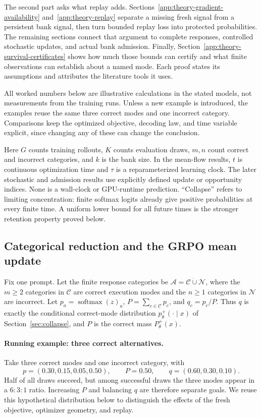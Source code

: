 \documentclass{article}
\newcommand{\1}{\mathbf 1}
\theoremstyle{remark}
\theoremstyle{definition}
\theoremstyle{plain}
\begin{document}
The second part asks what replay adds. Sections~\ref{app:theory-gradient-availability}
and~\ref{app:theory-replay} separate a missing fresh signal from a persistent
bank signal, then turn bounded replay loss into protected probabilities.
The remaining sections connect that argument to complete responses,
controlled stochastic updates, and actual bank admission. Finally,
Section~\ref{app:theory-survival-certificates} shows how much those bounds
can certify and what finite observations can establish about a named mode.
Each proof states its assumptions and attributes the literature tools it uses.

All worked numbers below are illustrative calculations in the stated models,
not measurements from the training runs. Unless a new example is introduced,
the examples reuse the same three correct modes and one incorrect category.
Comparisons keep the optimized objective, decoding law, and time variable
explicit, since changing any of these can change the conclusion.

Here $G$ counts training rollouts, $K$ counts evaluation draws, $m,n$ count
correct and incorrect categories, and $k$ is the bank size. In the mean-flow results, $t$ is
continuous optimization time and $\tau$ is a reparameterized learning clock.
The later stochastic and admission results use explicitly defined update or
opportunity indices. None is a wall-clock or GPU-runtime prediction. ``Collapse'' refers to
limiting concentration: finite softmax logits already give positive
probabilities at every finite time. A uniform lower bound for all future
times is the stronger retention property proved below.

\subsection{Categorical reduction and the GRPO mean update}
\label{app:theory-grpo-mean}

Fix one prompt. Let the finite response categories be
$\mathcal A=\mathcal C\mathbin{\dot\cup}\mathcal N$, where the $m\ge2$
categories in $\mathcal C$ are correct execution modes and the $n\ge1$
categories in $\mathcal N$ are incorrect. Let
$p_a=\operatorname{softmax}(z)_a$, $P=\sum_{c\in\mathcal C}p_c$, and
$q_c=p_c/P$. Thus $q$ is exactly the conditional correct-mode distribution
$p_\theta^+(\cdot\mid x)$ of Section~\ref{sec:collapse}, and $P$ is the correct
mass $P_\theta^+(x)$.

\paragraph{Running example: three correct alternatives.}
\label{ex:theory-running}
Take three correct modes and one incorrect category, with
\[
 p=(0.30,0.15,0.05,0.50),\qquad P=0.50,\qquad q=(0.60,0.30,0.10).
\]
Half of all draws succeed, but among successful draws the three modes appear
in a $6{:}3{:}1$ ratio. Increasing $P$ and balancing $q$ are therefore
separate goals. We reuse this hypothetical distribution below to distinguish
the effects of the fresh objective, optimizer geometry, and replay.
\end{document}
